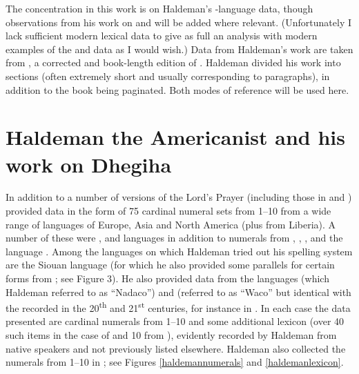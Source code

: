 \documentclass[output=paper]{LSP/langsci}
\begin{document}
The concentration in this work is on Haldeman's -language data, though observations from his work on  and  will be added where relevant. (Unfortunately I lack sufficient modern lexical data to give as full an analysis with modern examples of the  and  data as I would wish.)   Data from Haldeman's work are taken from \citet{Haldeman1860}, a corrected and book-length edition of \citet{Haldeman1859}.  Haldeman divided his work into sections (often extremely short and usually corresponding to paragraphs), in addition to the book being paginated.  Both modes of reference will be used here.  

\section{Haldeman the Americanist and his work on Dhegiha}  

In addition to a number of versions of the Lord's Prayer (including those in  and ) \citet{Haldeman1860}  provided data in the form of 75 cardinal numeral sets from 1--10 from a wide range of languages of Europe, Asia and North America (plus  from Liberia).  A number of these were ,  and  languages in addition to numerals from , , ,  and the  language . Among the languages on which Haldeman tried out his spelling system are the  Siouan language  (for which he also provided some  parallels for certain forms from \citealt{Riggs1852}; see Figure 3).  He also provided data from the  languages  (which Haldeman referred to as ``Nadaco'') and  (referred to as ``Waco'' but identical with the  recorded in the 20\textsuperscript{th} and 21\textsuperscript{st} centuries, for instance in \citet{Rood1975}. In each case the data presented are cardinal numerals from 1--10 and some additional lexicon (over 40 such items in the case of  and 10 from ), evidently recorded by Haldeman from native speakers and not previously listed elsewhere. Haldeman also collected the numerals from 1--10 in ; see Figures \ref{haldemannumerals} and \ref{haldemanlexicon}.   
\end{document}
